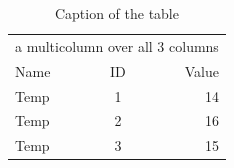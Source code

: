 \documentclass{article}
\numberwithin{equation}{section}
\begin{document}
\begin{table}[h!]
	\centering
	\caption[First table]{Caption of the table}
	\label{tab:my_label}
	\begin{tabular}{lcr}\hline
		\multicolumn{3}{c}{a multicolumn over all 3 columns} \\
		Name & ID & Value\\\hline
		Temp & 1  & 14  \\
		Temp & 2  & 16 \\
		Temp & 3 & 15 \\ \hline
	\end{tabular}
\end{table}




\end{document}

